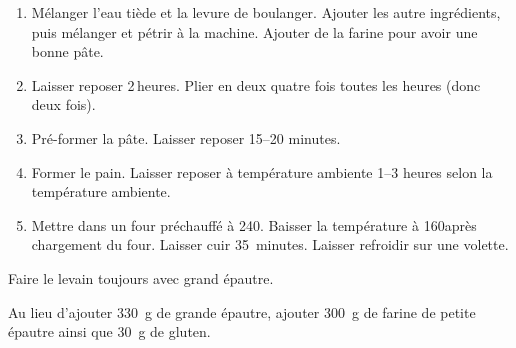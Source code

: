 
\begin{ingredients}
\end{ingredients}


\begin{recipe}
  \begin{enumerate}

  \item Mélanger l'eau tiède et la levure de boulanger.  Ajouter les
    autre ingrédients, puis mélanger et pétrir à la machine.  Ajouter
    de la farine pour avoir une bonne pâte.
    
  \item Laisser reposer 2$\,$\fracH heures.  Plier en deux quatre fois toutes
    les heures (donc deux fois).
    
  \item Pré-former la pâte.  Laisser reposer 15--20 minutes.
    
  \item Former le pain.  Laisser reposer à température ambiente 1--3
    heures selon la température ambiente.
    
  \item Mettre dans un four préchauffé à 240\degreeC.  Baisser la
    température à 160\degreeC après chargement du four.  Laisser cuir
    35~minutes.  Laisser refroidir sur une volette.

  \end{enumerate}
\end{recipe}


Faire le levain toujours avec grand épautre.

Au lieu d'ajouter 330~g de grande épautre, ajouter 300~g de farine de
petite épautre ainsi que 30~g de gluten.

